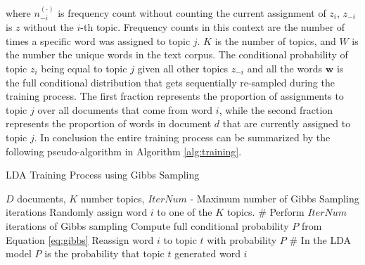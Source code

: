             where $n_{-i}^{(\cdot)}$ is frequency count without counting the current assignment of $z_i$, $z_{-i}$ is $z$ without the $i$-th topic. Frequency counts in this context are the number of times a specific word was assigned to topic $j$. $K$ is the number of topics, and $W$ is the number the unique words in the text corpus. The conditional probability of topic $z_i$ being equal to topic $j$ given all other topics $z_{-i}$ and all the words $\textbf{w}$ is the full conditional distribution that gets sequentially re-sampled during the training process. The first fraction represents the proportion of assignments to topic $j$ over all documents that come from word $i$, while the second fraction represents the proportion of words in document $d$ that are currently assigned to topic $j$. In conclusion the entire training process can be summarized by the following pseudo-algorithm in Algorithm \ref{alg:training}.
            
            
            
                    
            \begin{algorithm}
                \caption{LDA Training Process using Gibbs Sampling}
                \label{alg:training}
                \begin{algorithmic}[1]
                    \REQUIRE $D$ documents, $K$ number topics, $IterNum$ - Maximum number of Gibbs Sampling iterations 
                            \STATE Randomly assign word $i$ to one of the $K$ topics.
                        \ENDFOR
                    \ENDFOR
                    \STATE
                    \STATE \# Perform $IterNum$ iterations of Gibbs sampling
                                    \STATE Compute full conditional probability $P$ from Equation \ref{eq:gibbs}
                                    \STATE Reassign word $i$ to topic $t$ with probability $P$
                                    \STATE \# In the LDA model $P$ is the probability that topic $t$ generated word $i$
                                \ENDFOR
                            \ENDFOR
                        \ENDFOR
                    \ENDFOR
                \end{algorithmic}
            \end{algorithm} 
                
